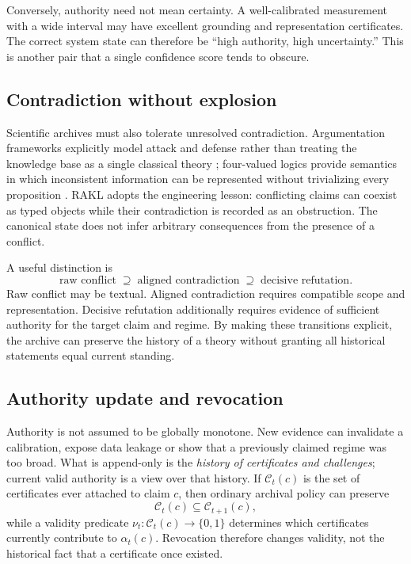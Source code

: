 \documentclass[11pt]{article}
\newcommand{\Bool}{\{0,1\}}
\begin{document}
Conversely, authority need not mean certainty. A well-calibrated measurement with a wide interval may have excellent grounding and representation certificates. The correct system state can therefore be ``high authority, high uncertainty.'' This is another pair that a single confidence score tends to obscure.

\subsection{Contradiction without explosion}

Scientific archives must also tolerate unresolved contradiction. Argumentation frameworks explicitly model attack and defense rather than treating the knowledge base as a single classical theory \cite{dung1995}; four-valued logics provide semantics in which inconsistent information can be represented without trivializing every proposition \cite{belnap1977}. RAKL adopts the engineering lesson: conflicting claims can coexist as typed objects while their contradiction is recorded as an obstruction. The canonical state does not infer arbitrary consequences from the presence of a conflict.

A useful distinction is
\[
\text{raw conflict}\;\supseteq\;\text{aligned contradiction}\;\supseteq\;\text{decisive refutation}.
\]
Raw conflict may be textual. Aligned contradiction requires compatible scope and representation. Decisive refutation additionally requires evidence of sufficient authority for the target claim and regime. By making these transitions explicit, the archive can preserve the history of a theory without granting all historical statements equal current standing.

\subsection{Authority update and revocation}

Authority is not assumed to be globally monotone. New evidence can invalidate a calibration, expose data leakage or show that a previously claimed regime was too broad. What is append-only is the \emph{history of certificates and challenges}; current valid authority is a view over that history. If \(\mathcal C_t(c)\) is the set of certificates ever attached to claim \(c\), then ordinary archival policy can preserve
\[
\mathcal C_t(c)\subseteq \mathcal C_{t+1}(c),
\]
while a validity predicate \(\nu_t:\mathcal C_t(c)\to\Bool\) determines which certificates currently contribute to \(\alpha_t(c)\). Revocation therefore changes validity, not the historical fact that a certificate once existed.
\end{document}
